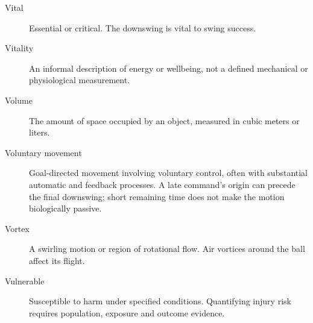 \begin{description}
\item[Vital] Essential or critical. The downswing is vital to swing success.

\item[Vitality] An informal description of energy or wellbeing, not a defined mechanical or physiological measurement.

\item[Volume] The amount of space occupied by an object, measured in cubic meters or liters.

\item[Voluntary movement] Goal-directed movement involving voluntary control, often with substantial automatic and feedback processes. A late command's origin can precede the final downswing; short remaining time does not make the motion biologically passive.

\item[Vortex] A swirling motion or region of rotational flow. Air vortices around the ball affect its flight.

\item[Vulnerable] Susceptible to harm under specified conditions. Quantifying injury risk requires population, exposure and outcome evidence.

\end{description}
